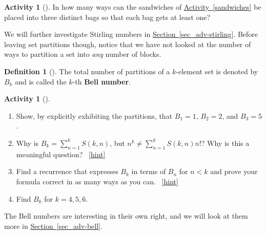 \documentclass[10pt,]{book}
\newcommand{\terminology}[1]{\textbf{#1}}
\theoremstyle{plain}
\theoremstyle{definition}
\newtheorem{definition}[theorem]{Definition}
\theoremstyle{definition}
\theoremstyle{definition}
\newtheorem{activity}[project]{Activity}
\numberwithin{equation}{chapter}
\newcommand{\lt}{<}
\begin{document}
\begin{activity}[]\label{activity-143}
\hypertarget{p-688}{}%
In how many ways can the sandwiches of \hyperref[sandwiches]{Activity~\ref{sandwiches}} be placed into three distinct bags so that each bag gets at least one?%
\end{activity}
\hypertarget{p-690}{}%
We will further investigate Stirling numbers in \hyperref[sec_adv-stirling]{Section~\ref{sec_adv-stirling}}.  Before leaving set partitions though, notice that we have not looked at the number of ways to partition a set into \emph{any} number of blocks.%
\begin{definition}[{}]\label{def-bell}
\hypertarget{p-691}{}%
The total number of partitions of a \(k\)-element set is denoted by \(B_k\) and is called the \(k\)-th \terminology{Bell number}.%
\end{definition}
\begin{activity}[]\label{BellNumberIntro}
\leavevmode%
\begin{enumerate}[font=\bfseries,label=(\alph*),ref=\alph*]
\item\label{task-144} \hypertarget{p-692}{}%
Show, by explicitly exhibiting the partitions, that \(B_1 = 1\), \(B_2 = 2\), and \(B_3 = 5\).%
\item\label{task-145} \hypertarget{p-694}{}%
Why is \(B_k = \sum_{n=1}^{k} S(k,n)\), but \(n^k \ne \sum_{n=1}^k S(k,n)n!\)?  Why is this a meaningful question?%
~\hfill{\tiny\hyperlink{a-144.b}{[hint]}\hypertarget{q-144.b}{}}\item\label{task-146} \hypertarget{p-696}{}%
Find a recurrence that expresses \(B_k\) in terms of \(B_n\) for \(n\lt  k\) and prove your formula correct in as many ways as you can.%
~\hfill{\tiny\hyperlink{a-144.c}{[hint]}\hypertarget{q-144.c}{}}\item\label{task-147} \hypertarget{p-700}{}%
Find \(B_k\) for \(k=4,5,6\).%
\end{enumerate}
\end{activity}
\hypertarget{p-702}{}%
The Bell numbers are interesting in their own right, and we will look at them more in \hyperref[sec_adv-bell]{Section~\ref{sec_adv-bell}}.%
\typeout{************************************************}
\typeout{************************************************}
\end{document}
